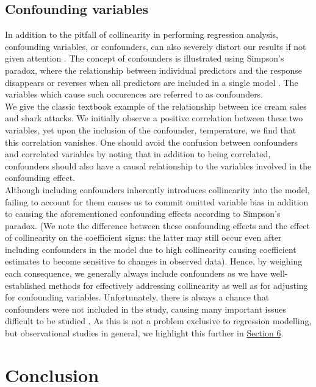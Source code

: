 \documentclass[12pt]{article}
\begin{document}
	
	
	
	\subsection{Confounding variables}
	
	In addition to the pitfall of collinearity in performing regression analysis, confounding variables, or confounders, can also severely distort our results if not given attention \cite{Johnston2018}. The concept of confounders is illustrated using Simpson's paradox, where the relationship between individual predictors and the response disappears or reverses when all predictors are included in a single model \cite{Agresti2015}. The variables which cause such occurences are referred to as confounders.\\
	
	We give the classic textbook example of the relationship between ice cream sales and shark attacks. We initially observe a positive correlation between these two variables, yet upon the inclusion of the confounder, temperature, we find that this correlation vanishes. One should avoid the confusion between confounders and correlated variables by noting that in addition to being correlated, confounders should also have a causal relationship to the variables involved in the confounding effect.\\
	
	Although including confounders inherently introduces collinearity into the model, failing to account for them causes us to commit omitted variable bias in addition to causing the aforementioned confounding effects according to Simpson's paradox. (We note the difference between these confounding effects and the effect of collinearity on the coefficient signs: the latter may still occur even after including confounders in the model due to high collinearity causing coefficient estimates to become sensitive to changes in observed data). Hence, by weighing each consequence, we generally always include confounders as we have well-established methods for effectively addressing collinearity as well as for adjusting for confounding variables. Unfortunately, there is always a chance that confounders were not included in the study, causing many important issues difficult to be studied \cite{Agresti2018}. As this is not a problem exclusive to regression modelling, but observational studies in general, we highlight this further in \hyperref[sec:future-rec]{Section 6}.
	
	\section{Conclusion}
	
\end{document}
